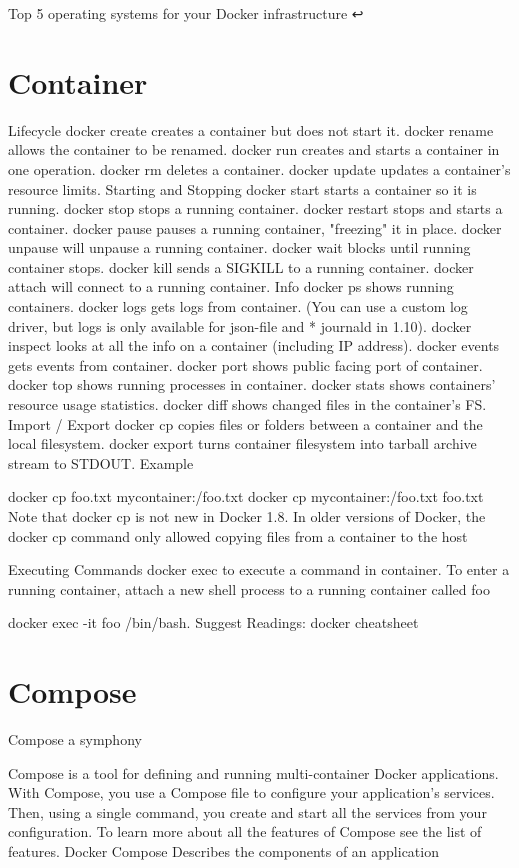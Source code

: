 Top 5 operating systems for your Docker infrastructure ↩

\section{Container}

Lifecycle
docker create creates a container but does not start it.
docker rename allows the container to be renamed.
docker run creates and starts a container in one operation.
docker rm deletes a container.
docker update updates a container's resource limits.
Starting and Stopping
docker start starts a container so it is running.
docker stop stops a running container.
docker restart stops and starts a container.
docker pause pauses a running container, "freezing" it in place.
docker unpause will unpause a running container.
docker wait blocks until running container stops.
docker kill sends a SIGKILL to a running container.
docker attach will connect to a running container.
Info
docker ps shows running containers.
docker logs gets logs from container. (You can use a custom log driver, but logs is only available for json-file and * journald in 1.10).
docker inspect looks at all the info on a container (including IP address).
docker events gets events from container.
docker port shows public facing port of container.
docker top shows running processes in container.
docker stats shows containers' resource usage statistics.
docker diff shows changed files in the container's FS.
Import / Export
docker cp copies files or folders between a container and the local filesystem.
docker export turns container filesystem into tarball archive stream to STDOUT.
Example

docker cp foo.txt mycontainer:/foo.txt
docker cp mycontainer:/foo.txt foo.txt
Note that docker cp is not new in Docker 1.8. In older versions of Docker, the docker cp command only allowed copying files from a container to the host

Executing Commands
docker exec to execute a command in container.
To enter a running container, attach a new shell process to a running container called foo

docker exec -it foo /bin/bash.
Suggest Readings: docker cheatsheet

\section{Compose}

Compose a symphony

Compose is a tool for defining and running multi-container Docker applications. With Compose, you use a Compose file to configure your application’s services. Then, using a single command, you create and start all the services from your configuration. To learn more about all the features of Compose see the list of features. Docker Compose Describes the components of an application

